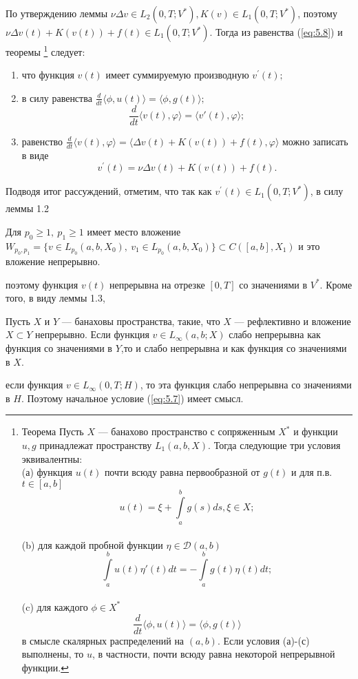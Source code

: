 По утверждению леммы $\nu\Delta v \in L_2(0, T; V^\ast), K(v) \in L_1(0, T; V^\ast)$, поэтому $\nu\Delta v(t) + K(v(t)) + f(t) \in L_1(0, T; V^\ast)$.
Тогда из равенства (\ref{eq:5.8}) и \linebreak теоремы \footnote{Теорема Пусть $X$ --- банахово пространство с сопряженным $X^*$ и функции $u,g$  принадлежат пространству
$L_1(a,b,X).$ Тогда следующие три условия эквивалентны:\\
(а) функция $u(t)$ почти всюду равна первообразной от $g(t)$ и для п.в. $t\in[a,b]$ $$u(t)=\xi+\int\limits_a^b g(s)ds, \xi\in X;$$\\
(b) для каждой пробной функции $\eta\in\mathcal{D}(a,b)$ $$\int\limits_a^b u(t)\eta'(t)dt= -\int\limits_a^b g(t)\eta(t)dt;$$\\
(c) для каждого $\phi\in X^*$ $$\frac{d}{dt}\langle \phi, u(t) \rangle = \langle \phi, g(t) \rangle$$ в смысле скалярных распределений на $(a,b).$
Если условия (а)-(с) выполнены, то $u$, в частности, почти всюду равна некоторой непрерывной функции.} следует:
\begin{enumerate}
    \item что функция $v(t)$ имеет суммируемую производную $v^\prime(t);$
    \item в силу равенства $\frac{d}{dt}\langle \phi, u(t) \rangle = \langle \phi, g(t) \rangle;$
    $$\frac{d}{dt} \langle v(t), \varphi \rangle = \langle v'(t), \varphi \rangle;$$
    \item равенство $\frac{d}{dt}\langle v(t), \varphi \rangle=\langle \Delta v(t)+K(v(t))+f(t),\varphi\rangle$ можно записать в виде
    $$v^\prime(t)=\nu\Delta v(t)+K(v(t))+f(t).$$
\end{enumerate}

Подводя итог рассуждений, отметим, что так как $v^\prime(t) \in L_1(0, T; V^\ast)$, в силу леммы 1.2
\begin{lemma}
Для $p_0\ge 1, \ p_1\ge 1$ имеет место вложение\linebreak
$W_{p_0,p_1}=\{v\in L_{p_0}(a,b,X_0), \ v_1\in L_{p_0}(a,b,X_0)\}\subset C([a,b],X_1)$
и это вложение непрерывно.
\end{lemma}
\noindent
поэтому функция $v(t)$ непрерывна на отрезке $[0, T]$ со значениями в $V^\ast$.
Кроме того, в виду леммы 1.3,
\begin{lemma}
Пусть $X$ и $Y$ --- банаховы пространства, такие, что $X$ --- рефлективно и вложение $X\subset Y$ непрерывно.
Если функция $v\in L_{\infty}(a,b;X)$ слабо непрерывна как функция со значениями в $Y$,то и слабо непрерывна и как функция со значениями в $X$.
\end{lemma}
\noindent
если функция $v\in L_{\infty} (0,T;H)$, то эта функция слабо непрерывна со значениями в $H$. Поэтому начальное условие (\ref{eq:5.7}) имеет смысл.

